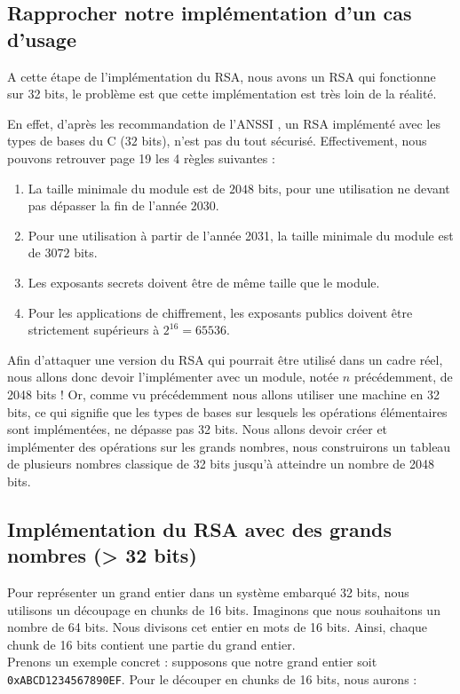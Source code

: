 \subsection{Rapprocher notre implémentation d'un cas d'usage}
A cette étape de l'implémentation du RSA, nous avons un RSA qui fonctionne sur 32 bits, le problème est que cette implémentation est très loin de la réalité.

En effet, d'après les recommandation de l'ANSSI \cite{anssi:guide}, un RSA implémenté avec les types de bases du C ($32$ bits), n'est pas du tout sécurisé. Effectivement, nous pouvons retrouver page 19 les 4 règles suivantes :
\begin{enumerate}
  \item La taille minimale du module est de $2048$ bits, pour une utilisation ne devant
pas dépasser la fin de l’année 2030.
  \item Pour une utilisation à partir de l’année 2031, la taille minimale du module
est de $3072$ bits.
  \item Les exposants secrets doivent être de même taille que le module.
  \item Pour les applications de chiffrement, les exposants publics doivent être strictement supérieurs à $2^{16} = 65536$.
\end{enumerate}
Afin d'attaquer une version du RSA qui pourrait être utilisé dans un cadre réel, nous allons donc devoir l'implémenter avec un module, notée $n$ précédemment, de 2048 bits ! Or, comme vu précédemment nous allons utiliser une machine en 32 bits, ce qui signifie que les types de bases sur lesquels les opérations élémentaires sont implémentées, ne dépasse pas 32 bits. Nous allons devoir créer et implémenter des opérations sur les grands nombres, nous construirons un tableau de plusieurs nombres classique de 32 bits jusqu'à atteindre un nombre de 2048 bits.

\subsection{Implémentation du RSA avec des grands nombres (> 32 bits)}
Pour représenter un grand entier dans un système embarqué 32 bits, nous utilisons un découpage en chunks de 16 bits. Imaginons que nous souhaitons un nombre de 64 bits. Nous divisons cet entier en mots de 16 bits. Ainsi, chaque chunk de 16 bits contient une partie du grand entier.\\

Prenons un exemple concret : supposons que notre grand entier soit \texttt{0xABCD1234567890EF}. Pour le découper en chunks de 16 bits, nous aurons :

